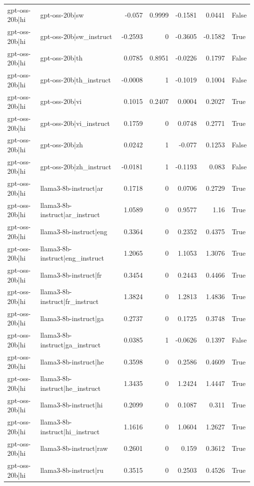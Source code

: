 \begin{table}
\begin{tabular}{l l r r r r l}
gpt-oss-20b|hi & gpt-oss-20b|sw & -0.057 & 0.9999 & -0.1581 & 0.0441 & False \\
gpt-oss-20b|hi & gpt-oss-20b|sw_instruct & -0.2593 & 0 & -0.3605 & -0.1582 & True \\
gpt-oss-20b|hi & gpt-oss-20b|th & 0.0785 & 0.8951 & -0.0226 & 0.1797 & False \\
gpt-oss-20b|hi & gpt-oss-20b|th_instruct & -0.0008 & 1 & -0.1019 & 0.1004 & False \\
gpt-oss-20b|hi & gpt-oss-20b|vi & 0.1015 & 0.2407 & 0.0004 & 0.2027 & True \\
gpt-oss-20b|hi & gpt-oss-20b|vi_instruct & 0.1759 & 0 & 0.0748 & 0.2771 & True \\
gpt-oss-20b|hi & gpt-oss-20b|zh & 0.0242 & 1 & -0.077 & 0.1253 & False \\
gpt-oss-20b|hi & gpt-oss-20b|zh_instruct & -0.0181 & 1 & -0.1193 & 0.083 & False \\
gpt-oss-20b|hi & llama3-8b-instruct|ar & 0.1718 & 0 & 0.0706 & 0.2729 & True \\
gpt-oss-20b|hi & llama3-8b-instruct|ar_instruct & 1.0589 & 0 & 0.9577 & 1.16 & True \\
gpt-oss-20b|hi & llama3-8b-instruct|eng & 0.3364 & 0 & 0.2352 & 0.4375 & True \\
gpt-oss-20b|hi & llama3-8b-instruct|eng_instruct & 1.2065 & 0 & 1.1053 & 1.3076 & True \\
gpt-oss-20b|hi & llama3-8b-instruct|fr & 0.3454 & 0 & 0.2443 & 0.4466 & True \\
gpt-oss-20b|hi & llama3-8b-instruct|fr_instruct & 1.3824 & 0 & 1.2813 & 1.4836 & True \\
gpt-oss-20b|hi & llama3-8b-instruct|ga & 0.2737 & 0 & 0.1725 & 0.3748 & True \\
gpt-oss-20b|hi & llama3-8b-instruct|ga_instruct & 0.0385 & 1 & -0.0626 & 0.1397 & False \\
gpt-oss-20b|hi & llama3-8b-instruct|he & 0.3598 & 0 & 0.2586 & 0.4609 & True \\
gpt-oss-20b|hi & llama3-8b-instruct|he_instruct & 1.3435 & 0 & 1.2424 & 1.4447 & True \\
gpt-oss-20b|hi & llama3-8b-instruct|hi & 0.2099 & 0 & 0.1087 & 0.311 & True \\
gpt-oss-20b|hi & llama3-8b-instruct|hi_instruct & 1.1616 & 0 & 1.0604 & 1.2627 & True \\
gpt-oss-20b|hi & llama3-8b-instruct|raw & 0.2601 & 0 & 0.159 & 0.3612 & True \\
gpt-oss-20b|hi & llama3-8b-instruct|ru & 0.3515 & 0 & 0.2503 & 0.4526 & True \\

\end{tabular}
\end{table}
